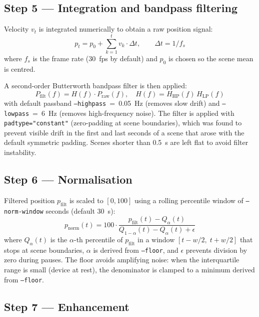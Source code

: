\documentclass[12pt,a4paper]{article}
\begin{document}
\subsection{Step 5 --- Integration and bandpass filtering}
\label{sec:integration}

Velocity $v_t$ is integrated numerically to obtain a raw position signal:
\begin{equation}
  p_t = p_0 + \sum_{k=1}^{t} v_k \cdot \Delta t, \qquad \Delta t = 1/f_s
\end{equation}
where $f_s$ is the frame rate (30~fps by default) and $p_0$ is chosen so the
scene mean is centred.

A second-order Butterworth bandpass filter is then applied:
\begin{equation}
  P_\mathrm{filt}(f) = H(f) \cdot P_\mathrm{raw}(f),
  \quad
  H(f) = H_\mathrm{HP}(f)\,H_\mathrm{LP}(f)
\end{equation}
with default passband \texttt{--highpass}~=~0.05~Hz (removes slow drift) and
\texttt{--lowpass}~=~6~Hz (removes high-frequency noise). The filter is applied
with \texttt{padtype="constant"} (zero-padding at scene boundaries), which was
found to prevent visible drift in the first and last seconds of a scene that
arose with the default symmetric padding. Scenes shorter than 0.5~s are left
flat to avoid filter instability.

\subsection{Step 6 --- Normalisation}
\label{sec:normalise}

Filtered position $p_\mathrm{filt}$ is scaled to $[0, 100]$ using a rolling
percentile window of \texttt{--norm-window} seconds (default 30~s):
\begin{equation}
  p_\mathrm{norm}(t) = 100 \cdot
    \frac{p_\mathrm{filt}(t) - Q_\alpha(t)}
         {Q_{1-\alpha}(t) - Q_\alpha(t) + \epsilon}
\end{equation}
where $Q_\alpha(t)$ is the $\alpha$-th percentile of
$p_\mathrm{filt}$ in a window $[t - w/2,\; t + w/2]$ that stops at scene
boundaries, $\alpha$ is derived from \texttt{--floor}, and $\epsilon$ prevents
division by zero during pauses. The floor avoids amplifying noise: when the
interquartile range is small (device at rest), the denominator is clamped to a
minimum derived from \texttt{--floor}.

\subsection{Step 7 --- Enhancement}
\label{sec:enhance}
\end{document}
